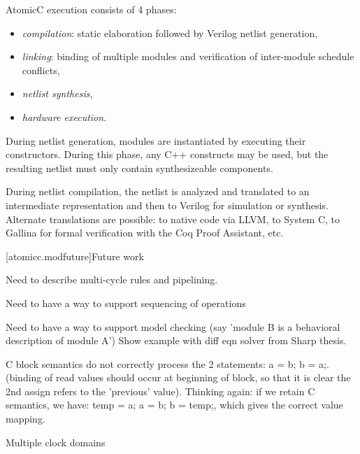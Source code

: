 AtomicC execution consists of 4 phases:
\begin{itemize}
\item \textit{compilation}: static elaboration followed by Verilog netlist generation, 
\item \textit{linking}: binding of multiple modules and verification of inter-module schedule conflicts,
\item \textit{netlist synthesis},
\item \textit{hardware execution}.
\end{itemize}

During netlist
generation, modules are instantiated by executing their
constructors. During this phase, any C++ constructs may be used, but
the resulting netlist must only contain synthesizeable components.

During netlist compilation, the netlist is analyzed and translated to
an intermediate representation and then to Verilog for simulation or
synthesis. Alternate translations are possible: to native code via
LLVM, to System C, to Gallina for formal verification with the Coq
Proof Assistant, etc.

[atomicc.modfuture]{Future work}

Need to describe multi-cycle rules and pipelining.

Need to have a way to support sequencing of operations

Need to have a way to support model checking (say 'module B is a behavioral description of module A')
Show example with diff eqn solver from Sharp thesis.

C block semantics do not correctly process the 2 statements: a = b; b = a;.
(binding of read values should occur at beginning of block, so that it is clear the
2nd assign refers to the 'previous' value).
Thinking again: if we retain C semantics, we have: temp = a; a = b; b = temp;, which
gives the correct value mapping.

Multiple clock domains
